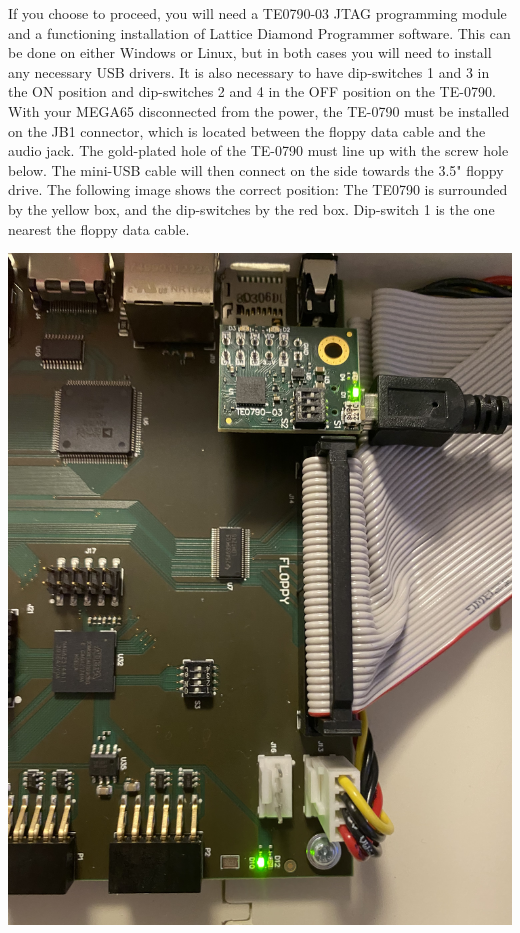 If you choose to proceed, you will need a TE0790-03 JTAG programming
module and a functioning installation of Lattice Diamond Programmer software.
This can be done on either Windows or Linux, but in both cases you will
need to install any necessary USB drivers. It is also necessary to have
dip-switches 1 and 3 in the ON position and dip-switches 2 and 4 in the
OFF position on the TE-0790. With your MEGA65 disconnected from the power,
the TE-0790 must be installed on the JB1 connector, which is located
between the floppy data cable and the audio jack.
The gold-plated hole of the TE-0790 must line up with the screw hole below.
The mini-USB cable will then connect on the side towards the 3.5" floppy drive.
The following image shows the correct position: The TE0790 is surrounded
by the yellow box, and the dip-switches by the red box. Dip-switch 1 is
the one nearest the floppy data cable.


\includegraphics[width=\linewidth]{images/jtag_detail_05.jpg}


